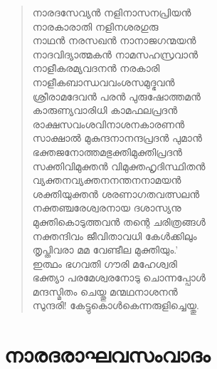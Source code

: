 \begin{verse}
നാരദസേവ്യന്‍ നളിനാസനപ്രിയന്‍\\
നാരകാരാതി നളിനശരഗുരു\\
നാഥന്‍ നരസഖന്‍ നാനാജഗന്മയന്‍\\
നാദവിദ്യാത്മകന്‍ നാമസഹസ്രവാന്‍\\
നാളീകരമ്യവദനന്‍ നരകാരി\\
നാളീകബാന്ധവവംശസമുദ്ഭവന്‍\\
ശ്രീരാമദേവന്‍ പരന്‍ പുരുഷോത്തമന്‍\\
കാരുണ്യവാരിധി കാമഫലപ്രദന്‍\\
രാക്ഷസവംശവിനാശനകാരണന്‍\\
സാക്ഷാല്‍ മുകുന്ദനാനന്ദപ്രദന്‍ പുമാന്‍\\
ഭക്തജനോത്തമഭുക്തിമുക്തിപ്രദന്‍\\
സക്തിവിമുക്തന്‍ വിമുക്തഹൃദിസ്ഥിതന്‍\\
വ്യക്തനവ്യക്തനനന്തനനാമയന്‍\\
ശക്തിയുക്തന്‍ ശരണാഗതവത്സലന്‍\\
നക്തഞ്ചരേശ്വരനായ ദശാസ്യനു\\
മുക്തികൊടുത്തവന്‍ തന്റെ ചരിത്രങ്ങള്‍\\
നക്തന്ദിവം ജീവിതാവധി കേള്‍ക്കിലും\\
തൃപ്തിവരാ മമ വേണ്ടീല മുക്തിയും.’\\
ഇത്ഥം ഭഗവതി ഗൗരി മഹേശ്വരി\\
ഭക്ത്യാ പരമേശ്വരനോടു ചൊന്നപ്പോള്‍\\
മന്ദസ്മിതം ചെയ്തു മന്മഥനാശനന്‍\\
സുന്ദരി! കേട്ടുകൊള്‍കെന്നരുളിച്ചെയ്തു.
\end{verse}


\section{നാരദരാഘവസംവാദം}

